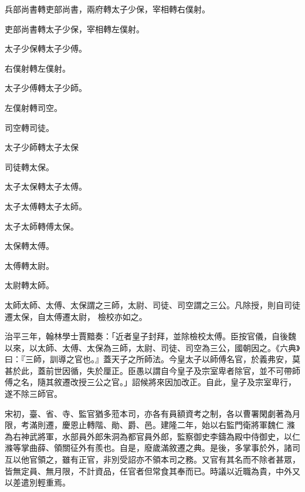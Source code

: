\begin{pinyinscope}
 兵部尚書轉吏部尚書，兩府轉太子少保，宰相轉右僕射。



 吏部尚書轉太子少保，宰相轉左僕射。



 太子少保轉太子少傅。



 右僕射轉左僕射。



 太子少傅轉太子少師。



 左僕射轉司空。



 司空轉司徒。



 太子少師轉太子太保



 司徒轉太保。



 太子太保轉太子太傅。



 太子太傅轉太子太師。



 太子太師轉傅太保。



 太保轉太傅。



 太傅轉太尉。



 太尉轉太師。



 太師太師、太傅、太保謂之三師，太尉、司徒、司空謂之三公。凡除授，則自司徒遷太保，自太傅遷太尉，
 檢校亦如之。



 治平三年，翰林學士賈黯奏：「近者皇子封拜，並除檢校太傅。臣按官儀，自後魏以來，以太師、太傅、太保為三師，太尉、司徒、司空為三公，國朝因之。《六典》曰：『三師，訓導之官也。』蓋天子之所師法。今皇太子以師傅名官，於義弗安，莫甚於此，蓋前世因循，失於厘正。臣愚以謂自今皇子及宗室卑者除官，並不可帶師傅之名，隨其敘遷改授三公之官。」詔候將來因加改正。自此，皇子及宗室卑行，遂不除三師官。



 宋初，臺、省、寺、監官猶多蒞本司，亦各有員額資考之制，各以曹署閑劇著為月限，考滿則遷，慶恩止轉階、勛、爵、邑。建隆二年，始以右監門衛將軍魏仁
 滌為右神武將軍，水部員外郎朱洞為都官員外郎，監察御史李鑄為殿中侍御史，以仁滌等掌曲薛、領關征外有羨也。自是，廢歲滿敘遷之典。是後，多掌事於外，諸司互以他官領之，雖有正官，非別受詔亦不領本司之務。又官有其名而不除者甚眾，皆無定員、無月限，不計資品，任官者但常食其奉而已。時議以近職為貴，中外又以差遣別輕重焉。




\end{pinyinscope}
